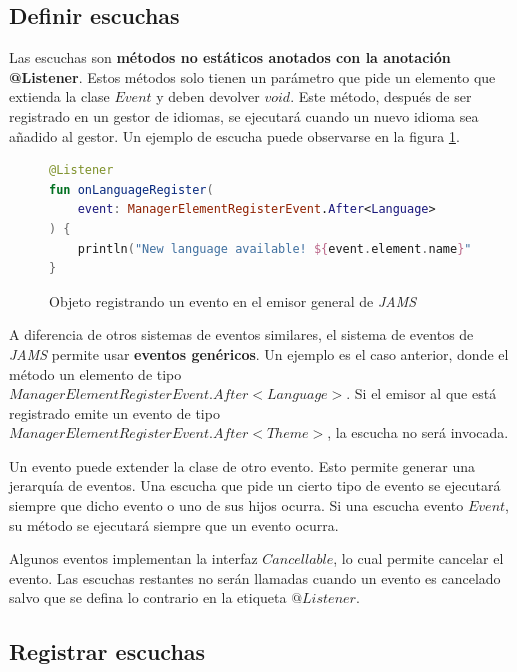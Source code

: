 \subsection{Definir escuchas}\label{subsec:definir-escuchas}

Las escuchas son \textbf{métodos no estáticos anotados con la anotación @Listener}.
Estos métodos solo tienen un parámetro que pide un elemento que extienda la clase
$Event$ y deben devolver $void$.
Este método, después de ser registrado en un gestor de idiomas,
se ejecutará cuando un nuevo idioma sea añadido al gestor.
Un ejemplo de escucha puede observarse en la figura \ref{fig:listener}.

\begin{figure}[h]
    \centering
    \begin{lstlisting}[frame=single,label={lst:listener},language=Kotlin]
@Listener
fun onLanguageRegister(
    event: ManagerElementRegisterEvent.After<Language>
) {
    println("New language available! ${event.element.name}")
}
    \end{lstlisting}
    \caption{Objeto registrando un evento en el emisor general de \textit{JAMS}}
    \label{fig:listener}
\end{figure}

 A diferencia de otros sistemas de eventos similares,
el sistema de eventos de \textit{JAMS} permite usar \textbf{eventos genéricos}.
Un ejemplo es el caso anterior, donde el método
 un elemento de tipo
$ManagerElementRegisterEvent.After<Language>$.
Si el emisor al que está registrado emite un evento de tipo
$ManagerElementRegisterEvent.After<Theme>$, la escucha no será invocada.

 Un evento puede extender la clase de otro evento.
Esto permite generar una jerarquía de eventos.
Una escucha que pide un cierto tipo de evento se ejecutará siempre que dicho evento o uno de sus hijos ocurra.
Si una escucha  evento $Event$, su método se ejecutará siempre que un evento ocurra.

 Algunos eventos implementan la interfaz $Cancellable$, lo cual permite cancelar el evento.
Las escuchas restantes no serán llamadas cuando un evento es cancelado salvo que se defina lo contrario
en la etiqueta $@Listener$.

\subsection{Registrar escuchas}\label{subsec:registrar-escuchas}

